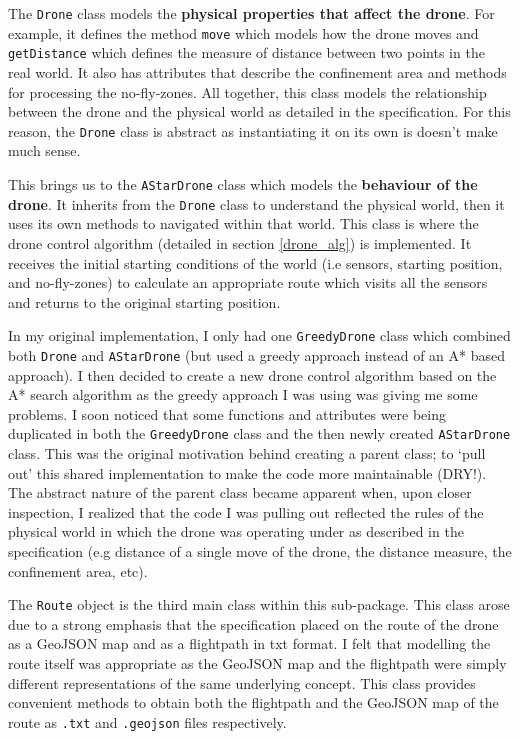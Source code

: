 \documentclass[11pt]{article}
\begin{document}
The \texttt{Drone} class models the \textbf{physical properties that affect the drone}. For example, it defines the method \texttt{move} which models how the drone moves and \texttt{getDistance} which defines the measure of distance between two points in the real world. It also has attributes that describe the confinement area and methods for processing the no-fly-zones. All together, this class models the relationship between the drone and the physical world as detailed in the specification. For this reason, the \texttt{Drone} class is abstract as instantiating it on its own is doesn't make much sense.

This brings us to the \texttt{AStarDrone} class which models the \textbf{behaviour of the drone}. It inherits from the \texttt{Drone} class to understand the physical world, then it uses its own methods to navigated within that world. This class is where the drone control algorithm (detailed in section \ref{drone_alg}) is implemented. It receives the initial starting conditions of the world (i.e sensors, starting position, and no-fly-zones) to calculate an appropriate route which visits all the sensors and returns to the original starting position.

\begin{mdframed}
In my original implementation, I only had one \texttt{GreedyDrone} class which combined both \texttt{Drone} and \texttt{AStarDrone} (but used a greedy approach instead of an A* based approach). I then decided to create a new drone control algorithm based on the A* search algorithm as the greedy approach I was using was giving me some problems. I soon noticed that some functions and attributes were being duplicated in both the \texttt{GreedyDrone} class and the then newly created \texttt{AStarDrone} class. This was the original motivation behind creating a parent class; to `pull out' this shared implementation to make the code more maintainable (DRY!). The abstract nature of the parent class became apparent when, upon closer inspection, I realized that the code I was pulling out reflected the rules of the physical world in which the drone was operating under as described in the specification (e.g distance of a single move of the drone, the distance measure, the confinement area, etc).
\end{mdframed}

The \texttt{Route} object is the third main class within this sub-package. This class arose due to a strong emphasis that the specification placed on the route of the drone as a GeoJSON map and as a flightpath in txt format. I felt that modelling the route itself was appropriate as the GeoJSON map and the flightpath were simply different representations of the same underlying concept. This class provides convenient methods to obtain both the flightpath and the GeoJSON map of the route as \texttt{.txt} and \texttt{.geojson} files respectively.
\end{document}
